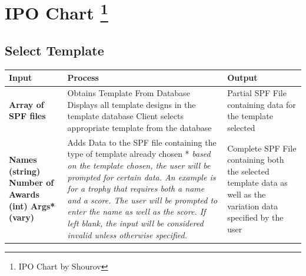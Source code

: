 \documentclass[oneside,openany,11pt,a4paper]{report}
\begin{document}
\section[IPO Chart]{IPO Chart \protect\footnote{IPO Chart by Shourov}}
\subsection{Select Template}
\begin{longtable}{|p{3cm}|p{5cm}|p{4cm}|}	
	\hline
	\rowcolor{gray!40}
	\textbf{Input} & \textbf{Process}  & \textbf{Output} \\ \hline
	
	\rowcolor{white}
	\textbf{Array of SPF files} &  
	Obtains Template From Database \newline
	Displays all template designs in the template database \newline
	Client selects appropriate template from the database
	 &  Partial SPF File containing data for the template selected \\ \hline
	
	\rowcolor{gray!25}
	\noindent \textbf{
		Names (string) \newline
		Number of Awards (int) \newline
		Args*(vary)
	} &  Adds Data to the SPF file containing the type of template already chosen \newline
* \textit{based on the template chosen, the user will be prompted for certain data. An example is for a trophy that requires both a name and a score. The user will be prompted to enter the name as well as the score. If left blank, the input will be considered invalid unless otherwise specified.}
 &  Complete SPF File containing both the selected template data as well as the variation data specified by the user \\ \hline
	
\end{longtable}
\end{document}
